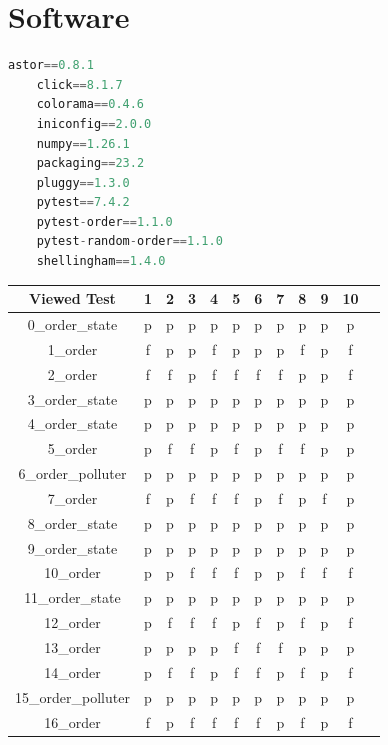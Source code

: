 \documentclass[
fancyheadings, %
%
%
]{stsreprt}
\begin{document}
\chapter{Software}
\begin{lstlisting}[language=Python, caption={requirements.txt (used packages in the project)}, label=lst:dep]
    astor==0.8.1
    click==8.1.7
    colorama==0.4.6
    iniconfig==2.0.0
    numpy==1.26.1
    packaging==23.2
    pluggy==1.3.0
    pytest==7.4.2
    pytest-order==1.1.0
    pytest-random-order==1.1.0
    shellingham==1.4.0
\end{lstlisting}

\begin{longtable}{|c|c|c|c|c|c|c|c|c|c|c|c|}
\hline
Viewed Test &  1 &  2 &  3 &  4 &  5 &  6 &  7 &  8 &  9 &  10 \\
\hline
0\_order\_state & p & p & p & p & p & p & p & p & p & p \\
\hline
1\_order & f & p & p & f & p & p & p & f & p & f \\
\hline
2\_order & f & f & p & f & f & f & f & p & p & f \\
\hline
3\_order\_state & p & p & p & p & p & p & p & p & p & p \\
\hline
4\_order\_state & p & p & p & p & p & p & p & p & p & p \\
\hline
5\_order & p & f & f & p & f & p & f & f & p & p \\
\hline
6\_order\_polluter & p & p & p & p & p & p & p & p & p & p \\
\hline
7\_order & f & p & f & f & f & p & f & p & f & p \\
\hline
8\_order\_state & p & p & p & p & p & p & p & p & p & p \\
\hline
9\_order\_state & p & p & p & p & p & p & p & p & p & p \\
\hline
10\_order & p & p & f & f & f & p & p & f & f & f \\
\hline
11\_order\_state & p & p & p & p & p & p & p & p & p & p \\
\hline
12\_order & p & f & f & f & p & f & p & f & p & f \\
\hline
13\_order & p & p & p & p & f & f & f & p & p & p \\
\hline
14\_order & p & f & f & p & f & f & p & f & p & f \\
\hline
15\_order\_polluter & p & p & p & p & p & p & p & p & p & p \\
\hline
16\_order & f & p & f & f & f & f & p & f & p & f \\

\end{longtable}
\end{document}

